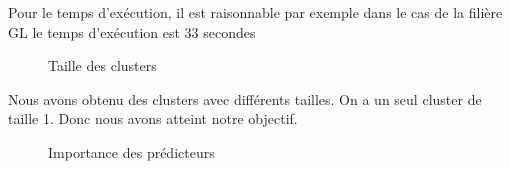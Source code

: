 \documentclass{article}
\begin{document}
            \newpage Pour le temps d’exécution, il est raisonnable par exemple dans le cas de la filière GL le temps d’exécution est 33 secondes
            \begin{figure}[h!]
                \centering
                \caption{Taille des clusters}
                \label{fig:22}
            \end{figure} 
            \par Nous avons obtenu des clusters avec différents tailles. On a un seul cluster de taille 1. Donc nous avons atteint notre objectif.
            \begin{figure}[h!]
                \centering
                \caption{Importance des prédicteurs}
                \label{fig:23}
            \end{figure} 
\end{document}
